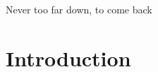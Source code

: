 \documentclass[12pt,a4paper,openright,twoside]{book}
\begin{document}
\begin{acknowledgements} %
Never too far down, to come back
\end{acknowledgements}

\tableofcontents   

\mainmatter

\chapter{Introduction}
\label{chap:introduction}
\end{document}
